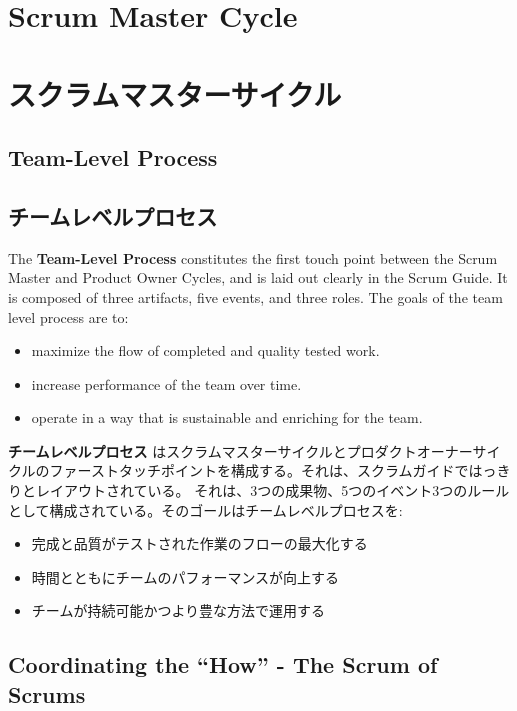 \documentclass[12pt,a4paper,parskip=full]{scrartcl}
\begin{document}
\section{Scrum Master Cycle}
\fi
\section{スクラムマスターサイクル}
\subsection{Team-Level Process}
\fi
\subsection{チームレベルプロセス}
The \textbf{Team-Level Process} constitutes the first touch point between the Scrum Master and Product Owner Cycles, and is laid out clearly in the Scrum Guide. It
is composed of three artifacts, five events, and three roles. The goals of
the team level process are to:
\begin{itemize}
\item maximize the flow of completed and quality tested work.
\item increase performance of the team over time.
\item operate in a way that is sustainable and enriching for the team.
\end{itemize}
\fi
\textbf{チームレベルプロセス} はスクラムマスターサイクルとプロダクトオーナーサイクルのファーストタッチポイントを構成する。それは、スクラムガイドではっきりとレイアウトされている。
それは、3つの成果物、5つのイベント3つのルールとして構成されている。そのゴールはチームレベルプロセスを:
\begin{itemize}
\item 完成と品質がテストされた作業のフローの最大化する
\item 時間とともにチームのパフォーマンスが向上する
\item チームが持続可能かつより豊な方法で運用する
\end{itemize}

\subsection{Coordinating the ``How'' - The Scrum of Scrums}
\fi
\end{document}
